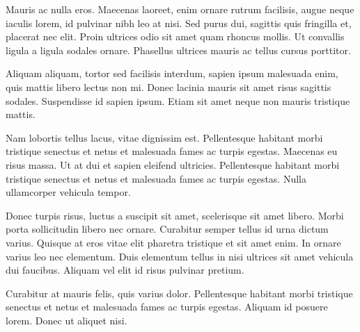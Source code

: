 Mauris ac nulla eros. Maecenas laoreet, enim ornare rutrum facilisis, augue neque iaculis lorem, id pulvinar nibh leo at nisi. Sed purus dui, sagittis quis fringilla et, placerat nec elit. Proin ultrices odio sit amet quam rhoncus mollis. Ut convallis ligula a ligula sodales ornare. Phasellus ultrices mauris ac tellus cursus porttitor. 

Aliquam aliquam, tortor sed facilisis interdum, sapien ipsum malesuada enim, quis mattis libero lectus non mi. Donec lacinia mauris sit amet risus sagittis sodales. Suspendisse id sapien ipsum. Etiam sit amet neque non mauris tristique mattis.

Nam lobortis tellus lacus, vitae dignissim est. Pellentesque habitant morbi tristique senectus et netus et malesuada fames ac turpis egestas. Maecenas eu risus massa. Ut at dui et sapien eleifend ultricies. Pellentesque habitant morbi tristique senectus et netus et malesuada fames ac turpis egestas. Nulla ullamcorper vehicula tempor. 

Donec turpis risus, luctus a suscipit sit amet, scelerisque sit amet libero. Morbi porta sollicitudin libero nec ornare. Curabitur semper tellus id urna dictum varius. Quisque at eros vitae elit pharetra tristique et sit amet enim. In ornare varius leo nec elementum. Duis elementum tellus in nisi ultrices sit amet vehicula dui faucibus. Aliquam vel elit id risus pulvinar pretium. 

Curabitur at mauris felis, quis varius dolor. Pellentesque habitant morbi tristique senectus et netus et malesuada fames ac turpis egestas. Aliquam id posuere lorem. Donec ut aliquet nisi.
